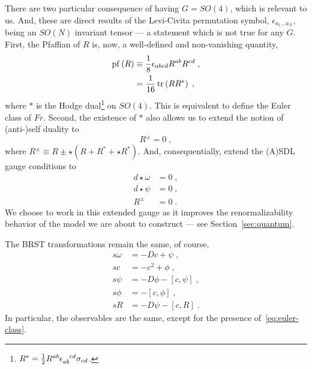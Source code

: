 \documentclass[../main.tex]{subfiles}
\begin{document}
There are two particular consequence of having $G=SO(4)$, which is relevant to us. And, these are direct results of the Levi-Civita permutation symbol, $ \epsilon_{a_1 \ldots a_N} $, being an $ SO(N) $ invariant tensor --- a statement which is not true for any $G$. First, the Pfaffian of $R$ is, now, a well-defined and non-vanishing quantity,
\begin{subequations}%
  \label{eq:euler-class}
  \begin{align}
    \operatorname{pf} \left( R \right) & \equiv \frac{ 1 }{ 8 } \epsilon_{abcd} R^{ab}R^{cd} \;, \\
                         & =\frac{ 1 }{ 16 } \operatorname{tr} \left( RR^* \right) \;,
  \end{align}
\end{subequations}
where $*$ is the Hodge dual\footnote{ $ R^* = \frac{ 1 }{ 2 } R^{ab}\tensor{ \epsilon }{_{ab}^{cd}} \sigma_{cd} $. } on $SO(4)$. This is equivalent to define the Euler class of $ Fr $. Second, the existence of $*$ also allows us to extend the notion of (anti-){}self duality to
\begin{equation}
  \label{eq:extended-self-duality}
  R^{ \pm } = 0  \;,
\end{equation}
where $ R^{ \pm } \equiv R \pm \star \left( R + R^{ * } + \star R^{ * } \right) $. And, consequentially, extend the (A){}SDL gauge conditions to
\begin{subequations}%
  \label{eq:extended-asdlg}
  \begin{align}
    d \star \omega & = 0 \;, \\
    d \star \psi   & = 0 \;, \\
    R^{ \pm }      & =0 \;.
  \end{align}
\end{subequations}
We choose to work in this extended gauge as it improves the renormalizability behavior of the model we are about to construct --- see Section~\ref{sec:quantum}.

The BRST transformations remain the same, of course,
\begin{subequations}%
  \label{eq:top_grav_brst}
  \begin{align}
    s\omega & = -Dc + \psi \;,                      \\
    sc      & = - c^2 + \phi \;,                    \\
    s\psi   & = -D\phi - \left[ c, \psi \right] \;, \\
    s\phi   & = - \left[ c, \phi \right]\;,         \\
    sR      & = -D\psi - \left[ c, R \right] \;.
  \end{align}
\end{subequations}
In particular, the observables are the same, except for the presence of~\eqref{eq:euler-class}.
\end{document}

